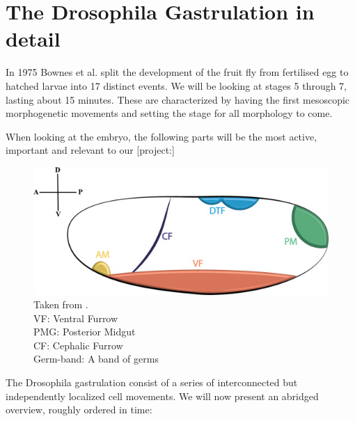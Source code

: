 \newpage
\section{The Drosophila Gastrulation in detail}
In 1975 Bownes et al. split the development of the fruit fly from fertilised egg to hatched larvae into 17 distinct events.\cite{bownes1975photographic} We will be looking at stages 5 through 7, lasting about 15 minutes. These are characterized by having the first mesoscopic morphogenetic movements and setting the stage for all morphology to come.

When looking at the embryo, the following parts will be the most active, important and relevant to our [project:]


\begin{figure}[H]
    \centering
    \includegraphics[width = 0.9\linewidth]{chapters/Theory/figures/morphogenic_events.jpg}
    \caption{Taken from . \\
    VF: Ventral Furrow\\
    PMG: Posterior Midgut\\
    CF: Cephalic Furrow\\
    Germ-band: A band of germs}
    \label{fig:enter-label}
\end{figure}


The Drosophila gastrulation consist of a series of interconnected but independently localized cell movements. We will now present an abridged overview, roughly ordered in time:





\newpage

